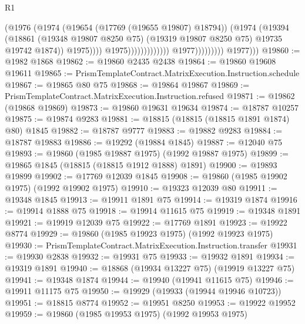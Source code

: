\begin{lexlean}{R1}
\begin{coremodule}
                                                        (@1976
                                                          (@1974
                                                            (@19654 (@17769 (@19655 @19807) @18794))
                                                            (@1974
                                                              (@19394
                                                                (@18861
                                                                  (@19348 @19807 @8250 @75)
                                                                  (@19319 @19807 @8250 @75)
                                                                  @19735
                                                                  @19742
                                                                  @1874))
                                                              @1975))))
                                                      @1975)))))))))))))
                            @1977)))))))))
          @1977)))
@19860 := @1982 @1868
@19862 := @19860 @2435 @2438
@19864 := @19860 @19608 @19611
@19865 := PrismTemplateContract.MatrixExecution.Instruction.schedule
@19867 := @19865 @80 @75
@19868 := @19864 @19867
@19869 := PrismTemplateContract.MatrixExecution.Instruction.refused
@19871 := @19862 (@19868 @19869)
@19873 := @19860 @19631 @19634
@19874 := @18787 @10257
@19875 := @19874 @9283
@19881 := @18815 (@18815 (@18815 @1891 @1874) @80) @1845
@19882 := @18787 @9777
@19883 := @19882 @9283
@19884 := @18787 @19883
@19886 := @19292 (@19884 @1845)
@19887 := @12040 @75
@19893 := @19860 (@1985 @19887 @1975) (@1992 @19887 @1975)
@19899 := @19865 @1845 (@18815 (@18815 @1912 @1888) @1891)
@19900 := @19893 @19899
@19902 := @17769 @12039 @1845
@19908 := @19860 (@1985 @19902 @1975) (@1992 @19902 @1975)
@19910 := @19323 @12039 @80
@19911 := @19348 @1845
@19913 := @19911 @1891 @75
@19914 := @19319 @1874
@19916 := @19914 @1888 @75
@19918 := @19914 @11615 @75
@19919 := @19348 @1891
@19921 := @19919 @12039 @75
@19922 := @17769 @1891
@19923 := @19922 @8774
@19929 := @19860 (@1985 @19923 @1975) (@1992 @19923 @1975)
@19930 := PrismTemplateContract.MatrixExecution.Instruction.transfer
@19931 := @19930 @2838
@19932 := @19931 @75
@19933 := @19932 @1891
@19934 := @19319 @1891
@19940 := @18868 (@19934 @13227 @75) (@19919 @13227 @75)
@19941 := @19348 @1874
@19944 := @19940 (@19941 @11615 @75)
@19946 := @19911 @11175 @75
@19950 := @19929 (@19933 (@19944 @19946 @10723))
@19951 := @18815 @8774
@19952 := @19951 @8250
@19953 := @19922 @19952
@19959 := @19860 (@1985 @19953 @1975) (@1992 @19953 @1975)

\end{coremodule}
\end{lexlean}
